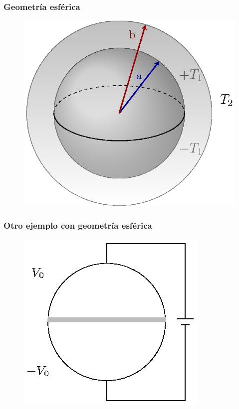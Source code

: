 \documentclass[12pt]{beamer}
\begin{document}
\begin{frame}
\frametitle{Geometría esférica}
\begin{figure}
  \centering
  \includegraphics[scale=0.75]{Imagenes/esfera1.eps}
\end{figure}
\end{frame}
\begin{frame}
\frametitle{Otro ejemplo con geometría esférica}
\begin{figure}
  \centering
  \includegraphics[scale=1]{Imagenes/Ejemplo_Esfera_03.eps}
\end{figure}
\end{frame}  
\end{document}
